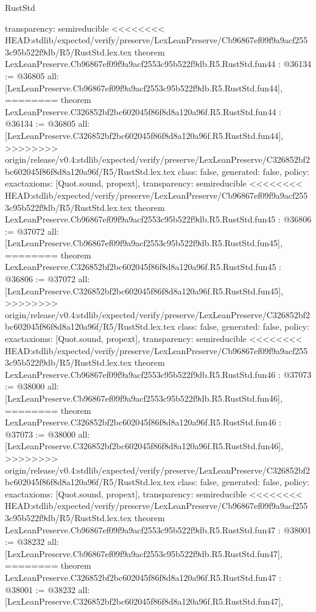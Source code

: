 \begin{lexlean}{RustStd}
\begin{coremodule}
{\begin{coremodule}
{{{{{{{{{{{{{{{{{{{{{{{{{{{{{{{{{{{{{{{{{{{{{{{  transparency: semireducible
}
<<<<<<<< HEAD:stdlib/expected/verify/preserve/LexLeanPreserve/Cb96867ef09f9a9acf2553c95b522f9db/R5/RustStd.lex.tex
theorem LexLeanPreserve.Cb96867ef09f9a9acf2553c95b522f9db.R5.RustStd.fun44 : @36134 := @36805 {
  all: [LexLeanPreserve.Cb96867ef09f9a9acf2553c95b522f9db.R5.RustStd.fun44],
========
theorem LexLeanPreserve.C326852bf2bc602045f86f8d8a120a96f.R5.RustStd.fun44 : @36134 := @36805 {
  all: [LexLeanPreserve.C326852bf2bc602045f86f8d8a120a96f.R5.RustStd.fun44],
>>>>>>>> origin/release/v0.4:stdlib/expected/verify/preserve/LexLeanPreserve/C326852bf2bc602045f86f8d8a120a96f/R5/RustStd.lex.tex
  class: false,
  generated: false,
  policy: exact{axioms: [Quot.sound, propext]},
  transparency: semireducible
}
<<<<<<<< HEAD:stdlib/expected/verify/preserve/LexLeanPreserve/Cb96867ef09f9a9acf2553c95b522f9db/R5/RustStd.lex.tex
theorem LexLeanPreserve.Cb96867ef09f9a9acf2553c95b522f9db.R5.RustStd.fun45 : @36806 := @37072 {
  all: [LexLeanPreserve.Cb96867ef09f9a9acf2553c95b522f9db.R5.RustStd.fun45],
========
theorem LexLeanPreserve.C326852bf2bc602045f86f8d8a120a96f.R5.RustStd.fun45 : @36806 := @37072 {
  all: [LexLeanPreserve.C326852bf2bc602045f86f8d8a120a96f.R5.RustStd.fun45],
>>>>>>>> origin/release/v0.4:stdlib/expected/verify/preserve/LexLeanPreserve/C326852bf2bc602045f86f8d8a120a96f/R5/RustStd.lex.tex
  class: false,
  generated: false,
  policy: exact{axioms: [Quot.sound, propext]},
  transparency: semireducible
}
<<<<<<<< HEAD:stdlib/expected/verify/preserve/LexLeanPreserve/Cb96867ef09f9a9acf2553c95b522f9db/R5/RustStd.lex.tex
theorem LexLeanPreserve.Cb96867ef09f9a9acf2553c95b522f9db.R5.RustStd.fun46 : @37073 := @38000 {
  all: [LexLeanPreserve.Cb96867ef09f9a9acf2553c95b522f9db.R5.RustStd.fun46],
========
theorem LexLeanPreserve.C326852bf2bc602045f86f8d8a120a96f.R5.RustStd.fun46 : @37073 := @38000 {
  all: [LexLeanPreserve.C326852bf2bc602045f86f8d8a120a96f.R5.RustStd.fun46],
>>>>>>>> origin/release/v0.4:stdlib/expected/verify/preserve/LexLeanPreserve/C326852bf2bc602045f86f8d8a120a96f/R5/RustStd.lex.tex
  class: false,
  generated: false,
  policy: exact{axioms: [Quot.sound, propext]},
  transparency: semireducible
}
<<<<<<<< HEAD:stdlib/expected/verify/preserve/LexLeanPreserve/Cb96867ef09f9a9acf2553c95b522f9db/R5/RustStd.lex.tex
theorem LexLeanPreserve.Cb96867ef09f9a9acf2553c95b522f9db.R5.RustStd.fun47 : @38001 := @38232 {
  all: [LexLeanPreserve.Cb96867ef09f9a9acf2553c95b522f9db.R5.RustStd.fun47],
========
theorem LexLeanPreserve.C326852bf2bc602045f86f8d8a120a96f.R5.RustStd.fun47 : @38001 := @38232 {
  all: [LexLeanPreserve.C326852bf2bc602045f86f8d8a120a96f.R5.RustStd.fun47],
}}}}}}}}}}}}}}}}}}}}}}}}}}}}}}}}}}}}}}}}}}}}}}}}}}}
\end{coremodule}}
\end{coremodule}
\end{lexlean}
